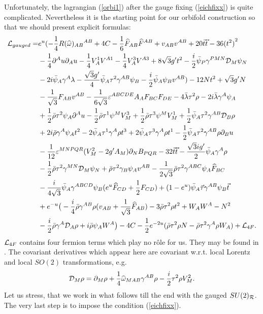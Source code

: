 \documentclass[a4paper,12pt, twoside]{article}
\numberwithin{equation}{section}
\begin{document}
Unfortunately, the lagrangian (\ref{orbi1}) after the gauge fixing 
(\ref{eichfixx}) is quite complicated. Nevertheless it is the starting 
point for our orbifold construction so that we should present explicit 
formulas:
\begin{equation}
\begin{split}
{\cal L}_{gauged} = & 
e^u(-\frac{1}{4}R(\widehat{\omega})_{AB}{}^{AB}+4C-\frac{1}{6}\widehat{F}_{AB}\widehat{F}^{AB}+v_{AB}v^{AB}+20 
\vec{t}\vec{t}-36{(t^2)}^2\\
& -\frac{1}{4}\partial^Au\partial_Au - \frac{1}{4}V_A^1V^{A1} - 
\frac{1}{4}V_A^3V^{A3}+8\sqrt{3}g't^2-\frac{i}{2}\bar{\psi}_P\gamma^{PMN}{\cal 
D}_M\psi_N\\
&-2i\bar{\psi}_A\gamma^A\lambda-\frac{\sqrt{3}g'}{4}\bar{\psi}_A\tau^2\gamma^{AB}\psi_B 
- \frac{i}{2}\bar{\psi}_A\psi_Bv^{AB}) -12Nt^2+\sqrt{3}g'N\\
& -\frac{1}{\sqrt{3}}F_{AB}v^{AB} 
-\frac{1}{6\sqrt{3}}\varepsilon^{ABCDE} A_AF_{BC}F_{DE}- 
4\bar{\lambda}\tau^2\rho-2i\bar{\lambda}\gamma^A\psi_A\\
& + 
\frac{1}{2}\bar{\rho}\tau^2\psi_A\partial^Au-\frac{1}{2}\bar{\rho}\tau^1\psi^MV_M^3+\frac{1}{2}\bar{\rho}\tau^3\psi^MV_M^1+\frac{1}{2}\bar{\psi}_A\tau^2\gamma^{AB}{\cal 
D}_B\rho\\
& + 2i\bar{\rho}\gamma^A\psi_A t^2 - 2\bar{\psi}_A\tau^1\gamma^A\rho 
t^3 + 2\bar{\psi}_A\tau^3\gamma^A\rho 
t^1-\frac{1}{2}\bar{\psi}_A\tau^2\gamma^{AB}\rho \partial_B u\\
& - \frac{1}{12}\varepsilon^{MNPQR}(V_M^2-2g'A_M)\partial_NB_{PQR}-32 
\vec{t}\vec{t}-\frac{\sqrt{3}ig'}{2}\bar{\psi}_A\gamma^A\rho \\
& - \frac{1}{2}\bar{\rho}\tau^2\gamma^{MN}{\cal D}_M\psi_N + 
\bar{\rho}\tau^2\gamma_B\psi_Av^{AB} - 
\frac{1}{2\sqrt{3}}\bar{\rho}\tau^2\gamma^{ABC}\psi_A\widehat{F}_{BC}\\
& - 
\frac{i}{4\sqrt{3}}\bar{\psi}_A\gamma^{ABCD}\psi_B(e^u\widehat{F}_{CD} + \frac{1}{2}F_{CD}) + 
(1-e^u)\bar{\psi}_A\vec{\tau}\gamma^{AB}\psi_B\vec{t}\\
& +e^{-u}\big( - 
\frac{i}{4}\bar{\rho}\gamma^{AB}\rho(v_{AB}+\frac{1}{\sqrt{3}}\widehat{F}_{AB}) - 3\bar{\rho}\tau^2\rho t^2+W_AW^A-N^2\\
& -\frac{i}{2}\bar{\rho}\gamma^A{\cal D}_A\rho+i\bar{\rho}\psi_A 
W^A\big)-4C -\frac{1}{2}e^{-2u}(\bar{\rho}\tau^2\rho N 
-\bar{\rho}\tau^2\gamma^A\rho W_A) +{\cal L}_{4F}.
\end{split}
\end{equation}
${\cal L}_{4F}$ contains four fermion terms which play no r\^ole for 
us. They may be found in \cite{diss}. The covariant derivatives which 
appear here are covariant w.r.t. local Lorentz and local $SO(2)$ 
transformations, e.g.
\[
{\cal 
D}_M\rho=\partial_M\rho+\frac{1}{4}\widehat{\omega}_{MAB}\gamma^{AB}\rho-\frac{i}{2}\tau^2\rho V_M^2.
\]
Let us stress, that we work in what follows till the end with the 
gauged $SU(2)_{\cal R}$. The very last step is to impose the condition 
(\ref{eichfixx}).
\end{document}
